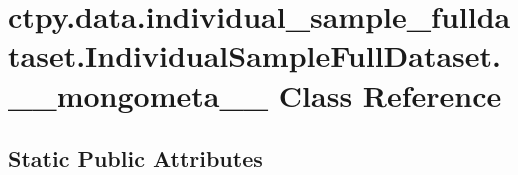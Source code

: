 \hypertarget{classctpy_1_1data_1_1individual__sample__fulldataset_1_1_individual_sample_full_dataset_1_1____mongometa____}{\section{ctpy.\-data.\-individual\-\_\-sample\-\_\-fulldataset.\-Individual\-Sample\-Full\-Dataset.\-\_\-\-\_\-mongometa\-\_\-\-\_\- Class Reference}
\label{classctpy_1_1data_1_1individual__sample__fulldataset_1_1_individual_sample_full_dataset_1_1____mongometa____}
}
\subsection*{Static Public Attributes}
